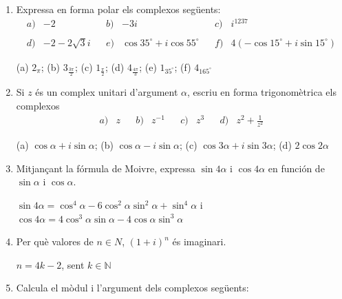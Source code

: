 \begin{enumerate}
\begin{indicacio}
$x^{2}-(7+3i)x+10+11i=0$
\end{indicacio}

\item Expressa en forma polar els complexos següents:
\[
\begin{array}{llllllll}
a) & -2 &  & b) & -3i &  & c) & i^{1237} \\
&  &  &  &  &  &  &  \\
d) & -2-2\sqrt{3}i &  & e) & \cos 35
^{\circ}
+i\cos 55
^{\circ}
&  & f) & 4(-\cos 15
^{\circ}
+i\sin 15
^{\circ}
)
\end{array}
\]

\begin{indicacio}
(a) $2_{\pi }$; (b) $3_{\frac{3\pi }{2}}$; (c) $1_{\frac{\pi }{
2}}$; (d) $4_{\frac{4\pi }{3}}$; (e) $1_{35
^{\circ}
}$; (f) $4_{165
^{\circ}
}$
\end{indicacio}

\item Si $z$ és un complex unitari d’argument $\alpha $, escriu en
forma trigonomètrica els complexos
\[
\begin{array}{lllllllllll}
a) & z &  & b) & z^{-1} &  & c) & z^{3} &  & d) & z^{2}+\frac{1}{z^{2}}
\end{array}
\]

\begin{indicacio}
(a) $\cos \alpha +i\sin \alpha $; (b) $\cos \alpha -i\sin
\alpha $; (c) $\cos 3\alpha +i\sin 3\alpha $; (d) $2\cos 2\alpha
$
\end{indicacio}

\item Mitjançant la fórmula de Moivre, expressa $\sin 4\alpha $ i $\cos
4\alpha $ en función de $\sin \alpha $ i $\cos \alpha $.

\begin{indicacio}
$\sin 4\alpha =\cos ^{4}\alpha -6\cos ^{2}\alpha \sin
^{2}\alpha +\sin ^{4}\alpha $ i $\cos 4\alpha =4\cos ^{3}\alpha
\sin \alpha -4\cos \alpha \sin ^{3}\alpha $
\end{indicacio}

\item Per què valores de $n\in N$, $(1+i)^{n}$ és imaginari.

\begin{indicacio}
$n=4k-2$, sent $k\in \mathbb{N}$
\end{indicacio}

\item Calcula el mòdul i l’argument dels complexos següents:


\end{enumerate}
